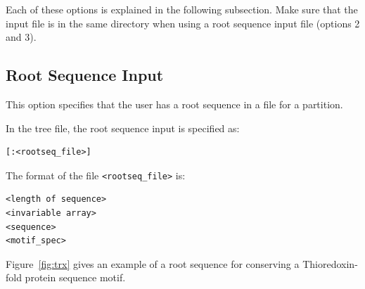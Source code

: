 \documentclass[10pt]{article}
\begin{document}
Each of these options is explained in the following subsection. Make sure that the input file is in the same directory when using a root sequence input file (options 2 and 3).

\subsection{Root Sequence Input}

This option specifies that the user has a root sequence in a file for a partition.

In the tree file, the root sequence input is specified as:
\begin{verbatim}
[:<rootseq_file>]
\end{verbatim}

The format of the file \verb+<rootseq_file>+ is:
\begin{verbatim}
<length of sequence>
<invariable array>
<sequence>
<motif_spec>
\end{verbatim}

Figure~\ref{fig:trx} gives an example of a root sequence for conserving a Thioredoxin-fold
protein sequence motif.
\end{document}
